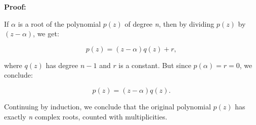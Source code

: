 \textbf{Proof:}

If \(\alpha\) is a root of the polynomial \(p(z)\) of degree \emph{n}, then by dividing 
\(p(z)\) by \((z - \alpha)\), we get:

\[
	p(z) = (z - \alpha) q(z) + r,
\]

where \(q(z)\) has degree \(n - 1\) and \(r\) is a constant. But since \(p(\alpha) = r = 0\), we conclude:

\[
	p(z) = (z - \alpha) q(z).
\]

Continuing by induction, we conclude that the original polynomial \(p(z)\) has exactly \emph{n} 
complex roots, counted with multiplicities.

\QED
